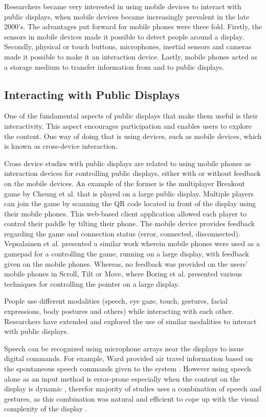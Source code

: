  Researchers became very interested in using mobile devices to interact with public  displays, when mobile devices became increasingly prevalent in the late 2000’s. The
 advantages put forward for mobile phones were three fold. Firstly, the sensors in mobile devices made it possible to detect people around a display. Secondly, physical or touch buttons, microphones, inertial
 sensors and cameras made it possible to make it an interaction device. Lastly, mobile
 phones acted as a storage medium to transfer information from and to public displays.
 
 \subsection{Interacting with Public Displays}
 One of the fundamental aspects of public displays that make them useful is their interactivity. This aspect encourages participation and enables users to explore the content. One way of doing that is using devices, such as mobile devices, which is known as cross-device interaction.
 
 Cross device studies with public displays are related to using mobile phones as interaction devices for controlling public displays, either with or without feedback on the mobile devices. An example of the former is the multiplayer Breakout game by Cheung et al. \cite{Cheung:2014} that is played on
 a large public display. Multiple players can join the game by scanning the QR code located in front of the display using their mobile phones. This web-based client application allowed each player to control their paddle by tilting their phone. The mobile device provides feedback regarding the game and connection status (error, connected, disconnected). Vepsalainen et al. \cite{Vepsalainen:2015} presented a similar work wherein mobile phones were used as a gamepad for a controlling the game, running on a large display, with feedback given on the mobile phones. Whereas, no feedback was provided on the users’
 mobile phones in Scroll, Tilt or Move, where Boring et al.\cite{Boring:2009} presented various techniques for controlling the pointer on a large display.
 
People use different modalities (speech, eye gaze, touch, gestures, facial expressions, body postures and others) while interacting with each other. Researchers have extended and explored the use of similar modalities to interact with public displays.

Speech can be recognized using microphone arrays near the displays to issue digital commands. For example, Ward provided air travel information based on the spontaneous speech commands given to the system \cite{Ward:1991}. However  using speech alone as an input method is error-prone especially when the content on the display is dynamic \cite{Oviatt:2000}, therefor majority of studies uses a combination of speech and gestures, as this combination was natural and efficient to cope up with the visual complexity of the display \cite{Angeli:1999}.

